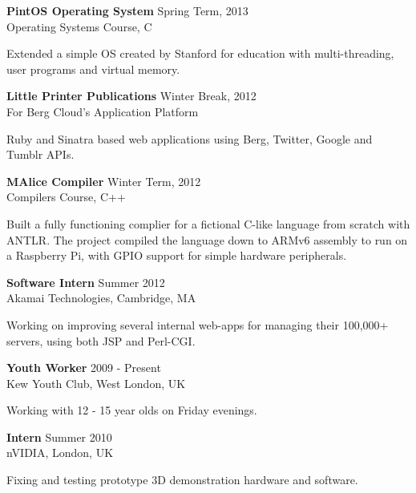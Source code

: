 \documentclass[line,margin]{res}
\newenvironment{myindentpar}[1]
 {\begin{list}{}
         {\setlength{\leftmargin}{#1}}
         \item[]
 }
 {\end{list}}
\begin{document}
\begin{resume}
                \textbf{PintOS Operating System} \hfill Spring Term, 2013 \\
                 Operating Systems Course, C
                \begin{myindentpar}{1cm}
				     Extended a simple OS created by Stanford for education with multi-threading, user programs and virtual memory.			    \end{myindentpar}
				
				\textbf{Little Printer Publications} \hfill Winter Break, 2012 \\
                 For Berg Cloud's Application Platform
                \begin{myindentpar}{1cm}
				    Ruby and Sinatra based web applications using Berg, Twitter, Google and Tumblr APIs.     
			   \end{myindentpar}

                 \textbf{MAlice Compiler} \hfill Winter Term, 2012 \\
                 Compilers Course, C++
                \begin{myindentpar}{1cm}
				     Built a fully functioning complier for a fictional C-like language from scratch with ANTLR. The project compiled the language down to ARMv6 assembly to run on a Raspberry Pi, with GPIO support for simple hardware peripherals.			    \end{myindentpar}
 
				\textbf{Software Intern} \hfill Summer 2012 \\
                 Akamai Technologies, Cambridge, MA
                \begin{myindentpar}{1cm}
				     Working on improving several internal web-apps for managing their 100,000+ servers, using both JSP and Perl-CGI.
			    \end{myindentpar}
 
                \textbf{Youth Worker} \hfill 2009 - Present \\
                Kew Youth Club, West London, UK
                \begin{myindentpar}{1cm}
                Working with 12 - 15 year olds on Friday evenings.
                \end{myindentpar}
				
				\textbf{Intern} \hfill Summer 2010 \\
                 nVIDIA, London, UK
                 \begin{myindentpar}{1cm}
                 Fixing and testing prototype 3D demonstration hardware and software.
                 \end{myindentpar}


\end{resume}
\end{document}
